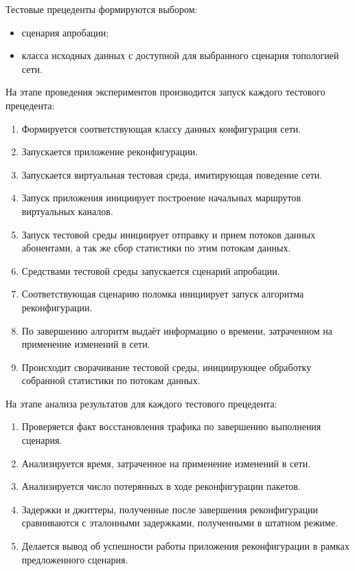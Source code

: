 \documentclass[12pt, a4paper]{article}
\begin{document}
Тестовые прецеденты формируются выбором:
\begin{itemize}
	\item сценария апробации;
	\item класса исходных данных с доступной для выбранного сценария топологией сети.
\end{itemize}

На этапе проведения экспериментов производится запуск каждого тестового прецедента:
\begin{enumerate}
	\item Формируется соответствующая классу данных конфигурация сети.
	\item Запускается приложение реконфигурации.
	\item Запускается виртуальная тестовая среда, имитирующая поведение сети.
	\item Запуск приложения инициирует построение начальных маршрутов виртуальных каналов.
	\item Запуск тестовой среды инициирует отправку и прием потоков данных абонентами, а так же сбор статистики по этим потокам данных.
	\item Средствами тестовой среды запускается сценарий апробации.
	\item Соответствующая сценарию поломка инициирует запуск алгоритма реконфигурации.
	\item По завершению алгоритм выдаёт информацию о времени, затраченном на применение изменений в сети.
	\item Происходит сворачивание тестовой среды, инициирующее обработку собранной статистики по потокам данных.
\end{enumerate}

На этапе анализа результатов для каждого тестового прецедента:
\begin{enumerate}
	\item Проверяется факт восстановления трафика по завершению выполнения сценария.
	\item Анализируется время, затраченное на применение изменений в сети.
	\item Анализируется число потерянных в ходе реконфигурации пакетов.
	\item Задержки и джиттеры, полученные после завершения реконфигурации сравниваются с эталонными задержками, полученными в штатном режиме.
	\item Делается вывод об успешности работы приложения реконфигурации в рамках предложенного сценария.
\end{enumerate}
\end{document}
